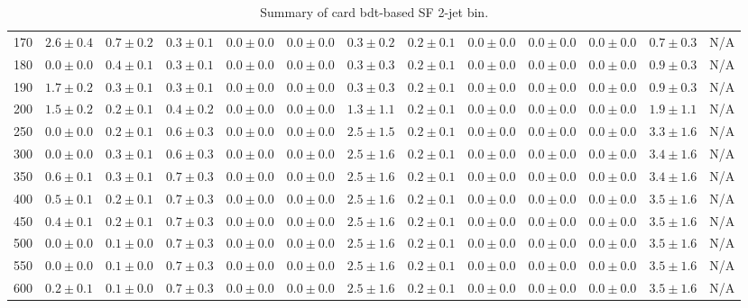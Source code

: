 \begin{table}
{\begin{center}
\begin{tabular}{l | c c | c c c c c c c c  | c c}
170 & $2.6\pm0.4$ & $0.7\pm0.2$ & $0.3\pm0.1$ & $0.0\pm0.0$ & $0.0\pm0.0$ & $0.3\pm0.2$ & $0.2\pm0.1$ & $0.0\pm0.0$ & $0.0\pm0.0$ & $0.0\pm0.0$ & $0.7\pm0.3$ & N/A \\
180 & $0.0\pm0.0$ & $0.4\pm0.1$ & $0.3\pm0.1$ & $0.0\pm0.0$ & $0.0\pm0.0$ & $0.3\pm0.3$ & $0.2\pm0.1$ & $0.0\pm0.0$ & $0.0\pm0.0$ & $0.0\pm0.0$ & $0.9\pm0.3$ & N/A \\
190 & $1.7\pm0.2$ & $0.3\pm0.1$ & $0.3\pm0.1$ & $0.0\pm0.0$ & $0.0\pm0.0$ & $0.3\pm0.3$ & $0.2\pm0.1$ & $0.0\pm0.0$ & $0.0\pm0.0$ & $0.0\pm0.0$ & $0.9\pm0.3$ & N/A \\
200 & $1.5\pm0.2$ & $0.2\pm0.1$ & $0.4\pm0.2$ & $0.0\pm0.0$ & $0.0\pm0.0$ & $1.3\pm1.1$ & $0.2\pm0.1$ & $0.0\pm0.0$ & $0.0\pm0.0$ & $0.0\pm0.0$ & $1.9\pm1.1$ & N/A \\
250 & $0.0\pm0.0$ & $0.2\pm0.1$ & $0.6\pm0.3$ & $0.0\pm0.0$ & $0.0\pm0.0$ & $2.5\pm1.5$ & $0.2\pm0.1$ & $0.0\pm0.0$ & $0.0\pm0.0$ & $0.0\pm0.0$ & $3.3\pm1.6$ & N/A \\
300 & $0.0\pm0.0$ & $0.3\pm0.1$ & $0.6\pm0.3$ & $0.0\pm0.0$ & $0.0\pm0.0$ & $2.5\pm1.6$ & $0.2\pm0.1$ & $0.0\pm0.0$ & $0.0\pm0.0$ & $0.0\pm0.0$ & $3.4\pm1.6$ & N/A \\
350 & $0.6\pm0.1$ & $0.3\pm0.1$ & $0.7\pm0.3$ & $0.0\pm0.0$ & $0.0\pm0.0$ & $2.5\pm1.6$ & $0.2\pm0.1$ & $0.0\pm0.0$ & $0.0\pm0.0$ & $0.0\pm0.0$ & $3.4\pm1.6$ & N/A \\
400 & $0.5\pm0.1$ & $0.2\pm0.1$ & $0.7\pm0.3$ & $0.0\pm0.0$ & $0.0\pm0.0$ & $2.5\pm1.6$ & $0.2\pm0.1$ & $0.0\pm0.0$ & $0.0\pm0.0$ & $0.0\pm0.0$ & $3.5\pm1.6$ & N/A \\
450 & $0.4\pm0.1$ & $0.2\pm0.1$ & $0.7\pm0.3$ & $0.0\pm0.0$ & $0.0\pm0.0$ & $2.5\pm1.6$ & $0.2\pm0.1$ & $0.0\pm0.0$ & $0.0\pm0.0$ & $0.0\pm0.0$ & $3.5\pm1.6$ & N/A \\
500 & $0.0\pm0.0$ & $0.1\pm0.0$ & $0.7\pm0.3$ & $0.0\pm0.0$ & $0.0\pm0.0$ & $2.5\pm1.6$ & $0.2\pm0.1$ & $0.0\pm0.0$ & $0.0\pm0.0$ & $0.0\pm0.0$ & $3.5\pm1.6$ & N/A \\
550 & $0.0\pm0.0$ & $0.1\pm0.0$ & $0.7\pm0.3$ & $0.0\pm0.0$ & $0.0\pm0.0$ & $2.5\pm1.6$ & $0.2\pm0.1$ & $0.0\pm0.0$ & $0.0\pm0.0$ & $0.0\pm0.0$ & $3.5\pm1.6$ & N/A \\
600 & $0.2\pm0.1$ & $0.1\pm0.0$ & $0.7\pm0.3$ & $0.0\pm0.0$ & $0.0\pm0.0$ & $2.5\pm1.6$ & $0.2\pm0.1$ & $0.0\pm0.0$ & $0.0\pm0.0$ & $0.0\pm0.0$ & $3.5\pm1.6$ & N/A \\
\hline
\end{tabular}
\end{center}
}
\caption{Summary of card bdt-based SF 2-jet bin.}
\end{table}

